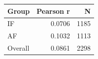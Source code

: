 \begin{tabular}{lrr}
  \toprule
  Group & Pearson r & N \\ 
  \midrule
  IF & 0.0706 & 1185 \\ 
  AF & 0.1032 & 1113 \\ 
  Overall & 0.0861 & 2298 \\ 
  \bottomrule
\end{tabular}
